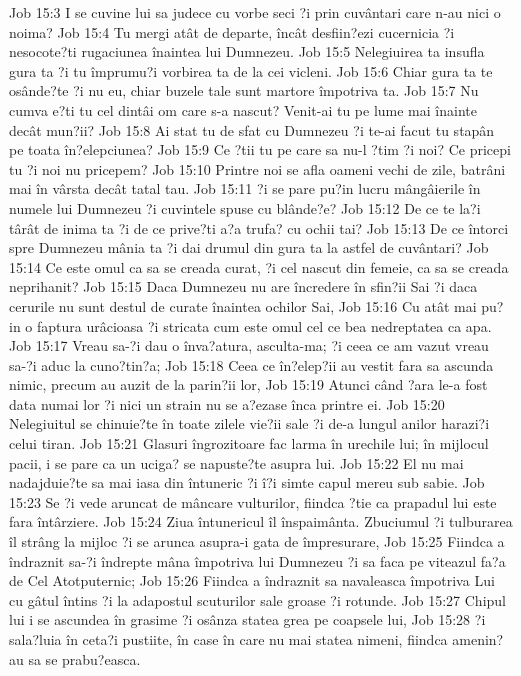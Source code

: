 Job 15:3  I se cuvine lui sa judece cu vorbe seci ?i prin cuvântari care n-au nici o noima?
Job 15:4  Tu mergi atât de departe, încât desfiin?ezi cucernicia ?i nesocote?ti rugaciunea înaintea lui Dumnezeu.
Job 15:5  Nelegiuirea ta insufla gura ta ?i tu împrumu?i vorbirea ta de la cei vicleni.
Job 15:6  Chiar gura ta te osânde?te ?i nu eu, chiar buzele tale sunt martore împotriva ta.
Job 15:7  Nu cumva e?ti tu cel dintâi om care s-a nascut? Venit-ai tu pe lume mai înainte decât mun?ii?
Job 15:8  Ai stat tu de sfat cu Dumnezeu ?i te-ai facut tu stapân pe toata în?elepciunea?
Job 15:9  Ce ?tii tu pe care sa nu-l ?tim ?i noi? Ce pricepi tu ?i noi nu pricepem?
Job 15:10  Printre noi se afla oameni vechi de zile, batrâni mai în vârsta decât tatal tau.
Job 15:11  ?i se pare pu?in lucru mângâierile în numele lui Dumnezeu ?i cuvintele spuse cu blânde?e?
Job 15:12  De ce te la?i târât de inima ta ?i de ce prive?ti a?a trufa? cu ochii tai?
Job 15:13  De ce întorci spre Dumnezeu mânia ta ?i dai drumul din gura ta la astfel de cuvântari?
Job 15:14  Ce este omul ca sa se creada curat, ?i cel nascut din femeie, ca sa se creada neprihanit?
Job 15:15  Daca Dumnezeu nu are încredere în sfin?ii Sai ?i daca cerurile nu sunt destul de curate înaintea ochilor Sai,
Job 15:16  Cu atât mai pu?in o faptura urâcioasa ?i stricata cum este omul cel ce bea nedreptatea ca apa.
Job 15:17  Vreau sa-?i dau o înva?atura, asculta-ma; ?i ceea ce am vazut vreau sa-?i aduc la cuno?tin?a;
Job 15:18  Ceea ce în?elep?ii au vestit fara sa ascunda nimic, precum au auzit de la parin?ii lor,
Job 15:19  Atunci când ?ara le-a fost data numai lor ?i nici un strain nu se a?ezase înca printre ei.
Job 15:20  Nelegiuitul se chinuie?te în toate zilele vie?ii sale ?i de-a lungul anilor harazi?i celui tiran.
Job 15:21  Glasuri îngrozitoare fac larma în urechile lui; în mijlocul pacii, i se pare ca un uciga? se napuste?te asupra lui.
Job 15:22  El nu mai nadajduie?te sa mai iasa din întuneric ?i î?i simte capul mereu sub sabie.
Job 15:23  Se ?i vede aruncat de mâncare vulturilor, fiindca ?tie ca prapadul lui este fara întârziere.
Job 15:24  Ziua întunericul îl înspaimânta. Zbuciumul ?i tulburarea îl strâng la mijloc ?i se arunca asupra-i gata de împresurare,
Job 15:25  Fiindca a îndraznit sa-?i îndrepte mâna împotriva lui Dumnezeu ?i sa faca pe viteazul fa?a de Cel Atotputernic;
Job 15:26  Fiindca a îndraznit sa navaleasca împotriva Lui cu gâtul întins ?i la adapostul scuturilor sale groase ?i rotunde.
Job 15:27  Chipul lui i se ascundea în grasime ?i osânza statea grea pe coapsele lui,
Job 15:28  ?i sala?luia în ceta?i pustiite, în case în care nu mai statea nimeni, fiindca amenin?au sa se prabu?easca.
